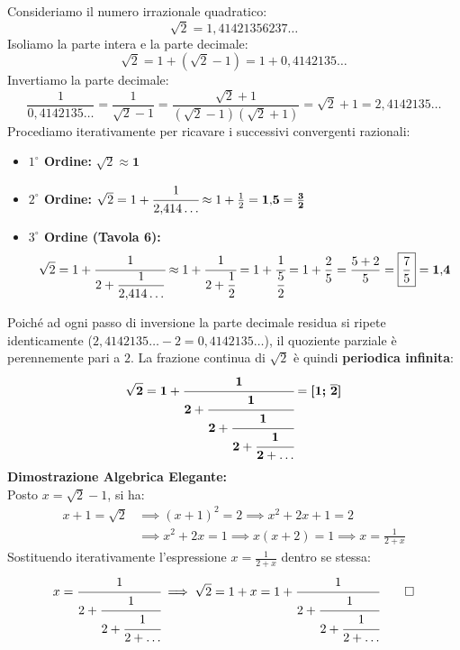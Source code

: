 \documentclass[11pt,a4paper,oneside]{report}
\begin{document}
\begin{laboratorio}
Consideriamo il numero irrazionale quadratico:
\begin{equation}
    \sqrt{2} = 1{,}41421356237\dots
\end{equation}
Isoliamo la parte intera e la parte decimale:
\begin{equation}
    \sqrt{2} = 1 + (\sqrt{2} - 1) = 1 + 0{,}4142135\dots
\end{equation}
Invertiamo la parte decimale:
\begin{equation}
    \frac{1}{0{,}4142135\dots} = \frac{1}{\sqrt{2} - 1} = \frac{\sqrt{2} + 1}{(\sqrt{2} - 1)(\sqrt{2} + 1)} = \sqrt{2} + 1 = 2{,}4142135\dots
\end{equation}
Procediamo iterativamente per ricavare i successivi convergenti razionali:
\begin{itemize}[leftmargin=2em]
    \item \textbf{$1^\circ$ Ordine:} $\sqrt{2} \approx \mathbf{1}$
    \item \textbf{$2^\circ$ Ordine:} $\sqrt{2} = 1 + \cfrac{1}{2{,}414\dots} \approx 1 + \frac{1}{2} = \mathbf{1{,}5} = \mathbf{\frac{3}{2}}$
    \item \textbf{$3^\circ$ Ordine (Tavola 6):}
    \begin{equation}
        \sqrt{2} = 1 + \cfrac{1}{2 + \dfrac{1}{2{,}414\dots}} \approx 1 + \cfrac{1}{2 + \dfrac{1}{2}} = 1 + \cfrac{1}{\dfrac{5}{2}} = 1 + \frac{2}{5} = \frac{5 + 2}{5} = \mathbf{\boxed{\frac{7}{5}}} = \mathbf{1{,}4}
    \end{equation}
\end{itemize}
\end{laboratorio}

\begin{metodo}
Poich\'e ad ogni passo di inversione la parte decimale residua si ripete identicamente ($2{,}4142135\dots - 2 = 0{,}4142135\dots$), il quoziente parziale \`e perennemente pari a $2$.
La frazione continua di $\sqrt{2}$ \`e quindi \textbf{periodica infinita}:
\begin{equation}
    \mathbf{\sqrt{2} = 1 + \cfrac{1}{2 + \cfrac{1}{2 + \cfrac{1}{2 + \cfrac{1}{2 + \dots}}}}} = \bm{[1; \, \overline{2}]}
\end{equation}
\textbf{Dimostrazione Algebrica Elegante:}\\
Posto $x = \sqrt{2} - 1$, si ha:
\begin{align}
    x + 1 = \sqrt{2} &\implies (x + 1)^2 = 2 \implies x^2 + 2x + 1 = 2 \\
    &\implies x^2 + 2x = 1 \implies x(x + 2) = 1 \implies x = \frac{1}{2 + x}
\end{align}
Sostituendo iterativamente l'espressione $x = \frac{1}{2 + x}$ dentro se stessa:
\begin{equation}
    x = \cfrac{1}{2 + \cfrac{1}{2 + \cfrac{1}{2 + \dots}}} \implies \sqrt{2} = 1 + x = 1 + \cfrac{1}{2 + \cfrac{1}{2 + \cfrac{1}{2 + \dots}}} \qedhere
\end{equation}
\end{metodo}
\end{document}
